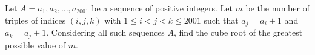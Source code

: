 Let $A=a_1,a_2,\ldots,a_{2001}$ be a sequence of positive integers. Let $m$ be the number of triples of indices $(i,j,k)$ with $1\le i<j<k\le2001$ such that $a_j=a_i+1$ and $a_k=a_j+1$. Considering all such sequences $A$, find the cube root of the greatest possible value of $m$.
